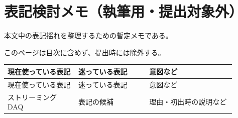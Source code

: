 \documentclass[../main.tex]{subfiles}
\begin{document}
\begingroup
\pagestyle{empty}
\section*{表記検討メモ（執筆用・提出対象外）}
本文中の表記揺れを整理するための暫定メモである。

このページは目次に含めず、提出時には除外する。

\small
\setlength{\tabcolsep}{5pt}
\renewcommand{\arraystretch}{1.35}
\begin{longtable}{|p{0.28\linewidth}|p{0.28\linewidth}|p{0.34\linewidth}|}
\hline
現在使っている表記 & 迷っている表記 & 意図など \\
\hline
\endfirsthead
\hline
現在使っている表記 & 迷っている表記 & 意図など \\
\hline
\endhead
ストリーミングDAQ & 表記の候補 & 理由・初出時の説明など \\
\hline
\end{longtable}
\clearpage
\endgroup
\end{document}
